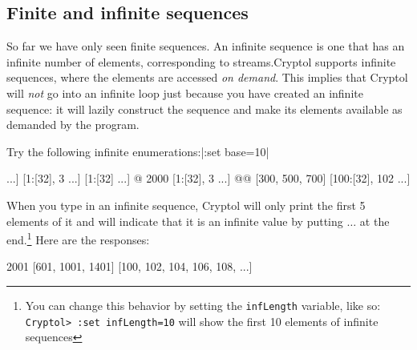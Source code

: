 \subsection{Finite and infinite sequences}\indFiniteSeq\indInfSeq
\label{sec:finite-infin-sequ}

So far we have only seen finite sequences. An infinite sequence is one
that has an infinite number of elements, corresponding to
streams.\indStream Cryptol supports infinite sequences, where the
elements are accessed \emph{on demand}. This implies that Cryptol will
\emph{not} go into an infinite loop just because you have created an
infinite sequence: it will lazily construct the sequence and make its
elements available as demanded by the program.

\restartrepl
\begin{Exercise}\label{ex:seq:9}
Try the following infinite enumerations:\hidereplin|:set base=10|
\begin{replinVerb}
  [1:[32] ...]
  [1:[32], 3 ...]
  [1:[32] ...] @ 2000
  [1:[32], 3 ...] @@ [300, 500, 700]
  [100:[32], 102 ...]
\end{replinVerb}
\end{Exercise}
\begin{Answer}
  When you type in an infinite sequence, Cryptol will only print the
  first 5 elements of it and will indicate that it is an infinite value
  by putting $\ldots$ at the end.\footnote{You can change this behavior
    by setting the {\tt infLength} variable, like so: {\tt Cryptol>
      :set infLength=10} will show the first 10 elements of infinite
    sequences} Here are the responses:
\begin{reploutVerb}
  [1, 2, 3, 4, 5, ...]
  [1, 3, 5, 7, 9, ...]
  2001
  [601, 1001, 1401]
  [100, 102, 104, 106, 108, ...]
\end{reploutVerb}
\end{Answer}

